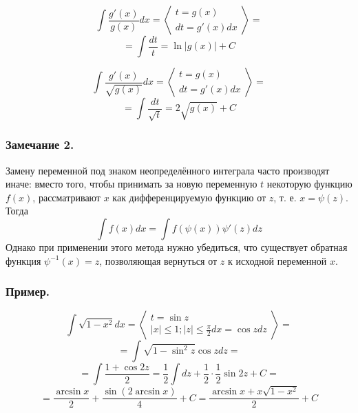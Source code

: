 $$\int \frac{g'(x)}{g(x)} dx = 
\left<\begin{array}{c}
t=g(x) \\
dt=g'(x)dx
\end{array}\right>=$$ $$=
\int \frac{dt}{t}=\ln|g(x)|+C
$$

$$\int \frac{g'(x)}{\sqrt{g(x)}} dx = 
\left<\begin{array}{c}
t=g(x) \\
dt=g'(x)dx
\end{array}\right>=$$ $$=
\int \frac{dt}{\sqrt{t}}=2\sqrt{g(x)}+C
$$

\subsubsection{Замечание 2.}
Замену переменной под знаком неопределённого интеграла часто производят иначе: вместо того, чтобы принимать за новую переменную $t$ некоторую функцию $f(x)$, рассматривают $x$ как дифференцируемую функцию от $z$, т. е. $x=\psi(z)$. Тогда
$$\int f(x)dx=\int f(\psi(x))\psi'(z)dz$$
Однако при применении этого метода нужно убедиться, что существует обратная функция $\psi^{-1}(x)=z$, позволяющая вернуться от $z$ к исходной переменной $x$.

\subsubsection{Пример.}
$$\int \sqrt{1-x^2}dx =
\left<\begin{array}{c}
t=\sin z \\
|x|\leq 1; |z|\leq \frac{\pi}{2}
dx=\cos z dz
\end{array}\right>=$$ $$=
\int\sqrt{1-\sin^2 z} \cos z dz=$$$$=
\int\frac{1+\cos 2z}{2}=\frac{1}{2}\int dz +\frac{1}{2}\cdot \frac{1}{2} \sin 2z +C=$$$$=
\frac{\arcsin x}{2}+\frac{\sin(2\arcsin x)}{4}+C=\frac{\arcsin x + x\sqrt{1-x^2}}{2}+C
$$
